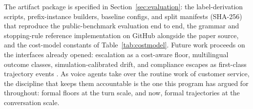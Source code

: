 The artifact package is specified in Section~\ref{sec:evaluation}: the label-derivation scripts, prefix-instance builders, baseline configs, and split manifests (SHA-256) that reproduce the public-benchmark evaluation end to end, the grammar and stopping-rule reference implementation on GitHub alongside the paper source, and the cost-model constants of Table~\ref{tab:costmodel}.
Future work proceeds on the interfaces already opened: escalation as a cost-aware floor, multilingual outcome classes, simulation-calibrated drift, and compliance escapes as first-class trajectory events \citep{queuecontrol2026}.
As voice agents take over the routine work of customer service, the discipline that keeps them accountable is the one this program has argued for throughout: formal floors at the turn scale, and now, formal trajectories at the conversation scale.
